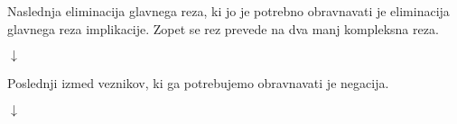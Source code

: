 \begin{prooftree}

\end{prooftree}
Naslednja eliminacija glavnega reza, ki jo je potrebno obravnavati je eliminacija glavnega reza implikacije. Zopet se rez prevede na dva manj kompleksna reza.
\begin{prooftree}


\end{prooftree}
\begin{center}
    $\downarrow$
\end{center}
\begin{prooftree}

\end{prooftree}
Poslednji izmed veznikov, ki ga potrebujemo obravnavati je negacija.
\begin{prooftree}


\end{prooftree}
\begin{center}
	$\downarrow$
\end{center}
\begin{prooftree}
\end{prooftree}

